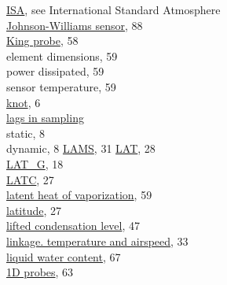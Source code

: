 \documentclass[
  english,
]{book}
\begin{document}
\href{./3-the-state-of-the-aircraft.html\#palt}{ISA}, see International
Standard Atmosphere\\
\href{./10-obsolete-variables.html\#jwlwc}{Johnson-Williams sensor},
88\\
\href{./5-cloud-physics-variables\#plwcc}{King probe}, 58\\
\hspace*{0.333em}\hspace*{0.333em}element dimensions, 59\\
\hspace*{0.333em}\hspace*{0.333em}power dissipated, 59\\
\hspace*{0.333em}\hspace*{0.333em}sensor temperature, 59\\
\href{./2-general-information-about-data-files.html\#units-and-abbreviations}{knot},
6\\
\href{./2-general-information-about-data-files\#synchronization-of-measurements}{lags
in sampling}\\
\hspace*{0.333em}\hspace*{0.333em}static, 8\\
\hspace*{0.333em}\hspace*{0.333em}dynamic, 8
\href{./4-the-state-of-the-atmosphere\#psx}{LAMS}, 31
\href{./3-the-state-of-the-aircraft.html\#latitude}{LAT}, 28\\
\href{./3-the-state-of-the-aircraft.html\#gglat}{LAT\_G}, 18\\
\href{./3-the-state-of-the-aircraft.html\#latc-lonc}{LATC}, 27\\
\href{./3-the-state-of-the-aircraft.html\#thetae}{latent heat of
vaporization}, 59\\
\href{./3-the-state-of-the-aircraft.html\#latitude}{latitude}, 27\\
\href{./3-the-state-of-the-aircraft.html\#thetae}{lifted condensation
level}, 47\\
\href{./4-the-state-of-the-atmosphere.html\#atx}{linkage. temperature
and airspeed}, 33\\
\href{./5-cloud-physics-variables.html\#plwcc}{liquid water content},
67\\
\hspace*{0.333em}\hspace*{0.333em}\href{./5-cloud-physics-variables.html\#PSD-LWC}{1D
probes}, 63\\
\end{document}
